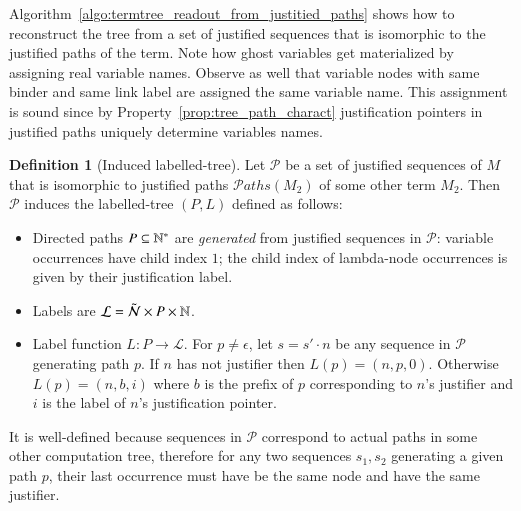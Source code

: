 \documentclass{elsarticle}
\theoremstyle{plain}
\theoremstyle{definition}
\newtheorem{definition}{Definition}[section]
\theoremstyle{remark}
\newcommand\Nodes{\mathcal{N}}%
\newcommand\ExtendedNodes{\tilde{\Nodes}}
\newcommand\pathset{{\mathcal{P}aths}} %
\begin{document}
Algorithm~\ref{algo:termtree_readout_from_justitied_paths} shows how to reconstruct the tree from a set of justified sequences that is isomorphic to the justified paths of the term. Note how ghost variables get materialized by  assigning real variable names. Observe as well that variable nodes with same binder and same link label are assigned the same variable name. This assignment is sound since by Property~\ref{prop:tree_path_charact} justification pointers in justified paths uniquely determine variables names.

\begin{definition}[Induced labelled-tree]
Let $\mathcal{P}$ be a set of justified sequences of $M$ that is isomorphic to justified paths $\pathset(M_2)$ of some other term $M_2$.
Then $\mathcal{P}$ induces the labelled-tree $(P,L)$ defined as follows:
\begin{itemize}[nosep]
    \item Directed paths $P \subseteq \mathbb{N}^*$ are \emph{generated} from justified sequences in $\mathcal{P}$: variable occurrences have child index $1$; the child index of lambda-node occurrences is given by their justification label.
    \item Labels are $\mathcal{L} = \ExtendedNodes \times P \times \nat$.
    \item Label function $L : P \rightarrow\mathcal{L}$.
    For $p\neq\epsilon$, let $s = s' \cdot n$ be any sequence in $\mathcal{P}$ generating path $p$.
    If $n$ has not justifier then $L(p) = (n, p, 0)$.
    Otherwise $L(p) = (n, b, i)$ where
    $b$ is the prefix of $p$ corresponding to $n$'s justifier and $i$ is the label of $n$'s justification pointer.
    \end{itemize}
\end{definition}
It is well-defined because sequences in $\mathcal{P}$ correspond to actual paths in some other computation tree, therefore for any two sequences $s_1, s_2$ generating a given path $p$, their last occurrence must have be the same node and have the same justifier.
\end{document}
